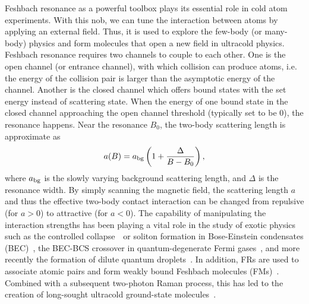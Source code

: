 Feshbach resonance as a powerful toolbox plays its essential role in cold atom experiments. With this nob, we can tune the interaction between atoms by applying an external field. Thus, it is used to explore the few-body (or many-body) physics and form molecules that open a new field in ultracold physics. Feshbach resonance requires two channels to couple to each other. One is the open channel (or entrance channel), with which collision can produce atoms, i.e. the energy of the collision pair is larger than the asymptotic energy of the channel. Another is the closed channel which offers bound states with the set energy instead of scattering state\cite{RevModPhys.82.1225}. When the energy of one bound state in the closed channel approaching the open channel threshold (typically set to be 0), the resonance happens. Near the resonance $B_0$, the two-body scattering length is approximate as
\begin{equation}
a(B) = a_{\rm bg}\left(1+\frac{\Delta}{B-B_0}\right),
\label{FR}
\end{equation}
where $a_{\rm bg}$ is the slowly varying background scattering length, and $\Delta$ is the resonance width. By simply scanning the magnetic field, the scattering length $a$ and thus the effective two-body contact interaction can be changed from repulsive (for $a > 0$) to attractive (for $a < 0$). The capability of manipulating the interaction strengths has been playing a vital role in the study of exotic physics such as the controlled collapse~\cite{donley2001}~or soliton formation in Bose-Einstein condensates (BEC)~\cite{Khaykovich2002,Strecker2002}, the BEC-BCS crossover in quantum-degenerate Fermi gases~\citep{PhysRevLett.92.040403,PhysRevLett.92.120403,Bartenstein2004,Bourdel2004}, and more recently the formation of dilute quantum droplets~\cite{petrov2015,ferrier2016Observation,cabrera2018quantum}. In addition, FRs are used to associate atomic pairs and form weakly bound Feshbach molecules (FMs)~\cite{Kohler2006}. Combined with a subsequent two-photon Raman process, this has led to the creation of long-sought ultracold ground-state molecules~\cite{ni2008,Takekoshi2014,Molony2014,Park2015,Guo2016,Voges2020}.

